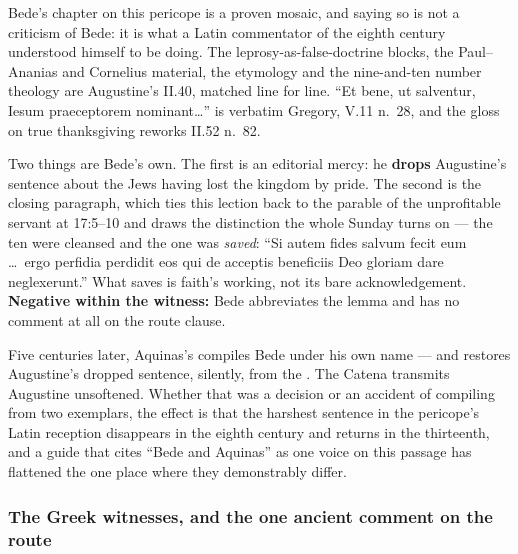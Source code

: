 \begin{witnessnote}
Bede's chapter on this pericope is a proven mosaic, and saying so is not a
criticism of Bede: it is what a Latin commentator of the eighth century
understood himself to be doing. The leprosy-as-false-doctrine blocks, the
Paul--Ananias and Cornelius material, the  etymology and the
nine-and-ten number theology are Augustine's  II.40, matched
line for line. ``Et bene, ut salventur, Iesum praeceptorem nominant\dots'' is
verbatim Gregory,  V.11 n.~28, and the gloss on true thanksgiving
reworks  II.52 n.~82.

Two things are Bede's own. The first is an editorial mercy: he \textbf{drops}
Augustine's sentence about the Jews having lost the kingdom by pride. The
second is the closing paragraph, which ties this lection back to the parable of
the unprofitable servant at 17:5--10 and draws the distinction the whole
Sunday turns on --- the ten were cleansed and the one was \textit{saved}:
``Si autem fides salvum fecit eum \dots\ ergo perfidia perdidit eos qui de
acceptis beneficiis Deo gloriam dare neglexerunt.'' What saves is faith's
working, not its bare acknowledgement. \textbf{Negative within the witness:}
Bede abbreviates the lemma and has no comment at all on the route clause.
\end{witnessnote}

Five centuries later, Aquinas's  compiles Bede under his own
name --- and restores Augustine's dropped sentence, silently, from the
. The Catena transmits Augustine unsoftened. Whether that was
a decision or an accident of compiling from two exemplars, the effect is that
the harshest sentence in the pericope's Latin reception disappears in the
eighth century and returns in the thirteenth, and a guide that cites ``Bede and
Aquinas'' as one voice on this passage has flattened the one place where they
demonstrably differ.

\subsubsection*{The Greek witnesses, and the one ancient comment on the route}

